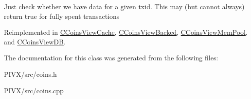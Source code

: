 Just check whether we have data for a given txid. This may (but cannot always) return true for fully spent transactions 

Reimplemented in \mbox{\hyperlink{class_c_coins_view_cache_aa8f0c55b6fc207d2188948a565125ab7}{C\+Coins\+View\+Cache}}, \mbox{\hyperlink{class_c_coins_view_backed_ad49041658bdec807d556e080476e6543}{C\+Coins\+View\+Backed}}, \mbox{\hyperlink{class_c_coins_view_mem_pool_a2c5900448dc5570053060686ad1f014b}{C\+Coins\+View\+Mem\+Pool}}, and \mbox{\hyperlink{class_c_coins_view_d_b_af55f35faadeb74b5406559fe3ed20114}{C\+Coins\+View\+DB}}.



The documentation for this class was generated from the following files\+:\begin{DoxyCompactItemize}
\item 
P\+I\+V\+X/src/coins.\+h\item 
P\+I\+V\+X/src/coins.\+cpp\end{DoxyCompactItemize}
